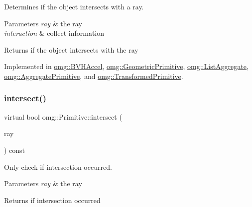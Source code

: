 Determines if the object intersects with a ray. 


\begin{DoxyParams}{Parameters}
{\em ray} & the ray \\
\hline
{\em interaction} & collect information \\
\hline
\end{DoxyParams}
\begin{DoxyReturn}{Returns}
if the object intersects with the ray 
\end{DoxyReturn}


Implemented in \mbox{\hyperlink{classomg_1_1_b_v_h_accel_a368b5156d04fdac833f8c9917f13d91e}{omg\+::\+B\+V\+H\+Accel}}, \mbox{\hyperlink{classomg_1_1_geometric_primitive_a21bc48f971cbc94b60791906f20bc925}{omg\+::\+Geometric\+Primitive}}, \mbox{\hyperlink{classomg_1_1_list_aggregate_a55fdd3b0fa387cb14488b86634b3e877}{omg\+::\+List\+Aggregate}}, \mbox{\hyperlink{classomg_1_1_aggregate_primitive_a07ab041d9071295e4f648475c7163470}{omg\+::\+Aggregate\+Primitive}}, and \mbox{\hyperlink{classomg_1_1_transformed_primitive_ab2ec675cf03eb5b8e59679c737e12ec4}{omg\+::\+Transformed\+Primitive}}.

\mbox{\label{classomg_1_1_primitive_a139c012a57ad2322c5bef078b5d7e653}} 
\subsubsection{\texorpdfstring{intersect()}{intersect()}\hspace{0.1cm}{\footnotesize\ttfamily [2/2]}}
{\footnotesize\ttfamily virtual bool omg\+::\+Primitive\+::intersect (\begin{DoxyParamCaption}\item[{const \mbox{\hyperlink{classomg_1_1_ray}{Ray}} \&}]{ray }\end{DoxyParamCaption}) const\hspace{0.3cm}{\ttfamily [pure virtual]}}



Only check if intersection occurred. 


\begin{DoxyParams}{Parameters}
{\em ray} & the ray \\
\hline
\end{DoxyParams}
\begin{DoxyReturn}{Returns}
if intersection occurred 
\end{DoxyReturn}


